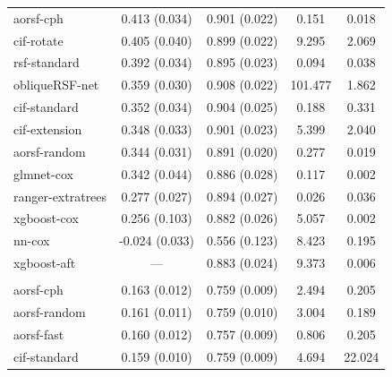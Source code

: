 \documentclass[12pt]{article}\usepackage[]{graphicx}\usepackage[]{xcolor}
\newenvironment{knitrout}{}{} %
\begin{document}
\begin{knitrout}
\begin{longtable}[t]{lcccc}
\hspace{1em}aorsf-cph & 0.413 (0.034) & 0.901 (0.022) & 0.151 & 0.018\\
\hspace{1em}cif-rotate & 0.405 (0.040) & 0.899 (0.022) & 9.295 & 2.069\\
\hspace{1em}rsf-standard & 0.392 (0.034) & 0.895 (0.023) & 0.094 & 0.038\\
\hspace{1em}obliqueRSF-net & 0.359 (0.030) & 0.908 (0.022) & 101.477 & 1.862\\
\hspace{1em}cif-standard & 0.352 (0.034) & 0.904 (0.025) & 0.188 & 0.331\\
\hspace{1em}cif-extension & 0.348 (0.033) & 0.901 (0.023) & 5.399 & 2.040\\
\hspace{1em}aorsf-random & 0.344 (0.031) & 0.891 (0.020) & 0.277 & 0.019\\
\hspace{1em}glmnet-cox & 0.342 (0.044) & 0.886 (0.028) & 0.117 & 0.002\\
\hspace{1em}ranger-extratrees & 0.277 (0.027) & 0.894 (0.027) & 0.026 & 0.036\\
\hspace{1em}xgboost-cox & 0.256 (0.103) & 0.882 (0.026) & 5.057 & 0.002\\
\hspace{1em}nn-cox & -0.024 (0.033) & 0.556 (0.123) & 8.423 & 0.195\\
\hspace{1em}xgboost-aft & --- & 0.883 (0.024) & 9.373 & 0.006\\
\addlinespace[0.3em]
\multicolumn{5}{l}{\textit{\textbf{Rotterdam tumor bank; death, n = 2982, p = 11}}}\\
\hline
\hspace{1em}aorsf-cph & 0.163 (0.012) & 0.759 (0.009) & 2.494 & 0.205\\
\hspace{1em}aorsf-random & 0.161 (0.011) & 0.759 (0.010) & 3.004 & 0.189\\
\hspace{1em}aorsf-fast & 0.160 (0.012) & 0.757 (0.009) & 0.806 & 0.205\\
\hspace{1em}cif-standard & 0.159 (0.010) & 0.759 (0.009) & 4.694 & 22.024\\

\end{longtable}
\end{knitrout}
\end{document}

